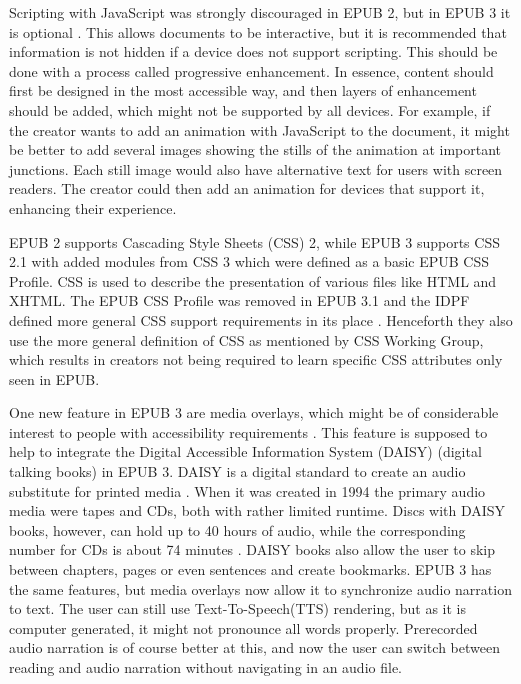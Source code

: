 Scripting with JavaScript was strongly discouraged in EPUB 2, but in EPUB 3 it is optional \cite{EPUB3bp}. This allows documents to be interactive, but it is recommended that information is not hidden if a device does not support scripting. This should be done with a process called progressive enhancement. In essence, content should first be designed in the most accessible way, and then layers of enhancement should be added, which might not be supported by all devices. For example, if the creator wants to add an animation with JavaScript to the document, it might be better to add several images showing the stills of the animation at important junctions. Each still image would also have alternative text for users with screen readers. The creator could then add an animation for devices that support it, enhancing their experience.

EPUB 2 supports Cascading Style Sheets (CSS) 2, while EPUB 3 supports CSS 2.1 with added modules from CSS 3 which were defined as a basic EPUB CSS Profile. CSS is used to describe the presentation of various files like HTML and XHTML. The EPUB CSS Profile was removed in EPUB 3.1 and the IDPF defined more general CSS support requirements in its place \cite{EPUB31changes}. Henceforth they also use the more general definition of CSS as mentioned by CSS Working Group, which results in creators not being required to learn specific CSS attributes only seen in EPUB.

One new feature in EPUB 3 are media overlays, which might be of considerable interest to people with accessibility requirements \cite{EPUB3bp}. This feature is supposed to help to integrate the Digital Accessible Information System (DAISY) (digital talking books) in EPUB 3. DAISY is a digital standard to create an audio substitute for printed media \cite{daisyAccessibility}. When it was created in 1994 the primary audio media were tapes and CDs, both with rather limited runtime. Discs with DAISY books, however, can hold up to 40 hours of audio, while the corresponding number for CDs is about 74 minutes \cite{wasIstDaisy}. DAISY books also allow the user to skip between chapters, pages or even sentences and create bookmarks. EPUB 3 has the same features, but media overlays now allow it to synchronize audio narration to text. The user can still use Text-To-Speech(TTS) rendering, but as it is computer generated, it might not pronounce all words properly. Prerecorded audio narration is of course better at this, and now the user can switch between reading and audio narration without navigating in an audio file.

